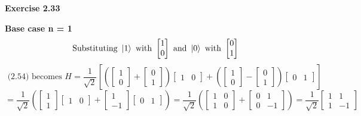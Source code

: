 \documentclass{article}
\begin{document}
\begin{framed}
    \noindent \textbf{Exercise 2.33}
    
    \medskip
    \textbf{Base case n = 1}
    $$
    \text{Substituting } \ket{1} \text{ with } \begin{bmatrix}1 \\ 0\end{bmatrix} \text{ and } \ket{0} \text{ with } \begin{bmatrix}0 \\ 1\end{bmatrix} $$
    $$\text{ (2.54) becomes } H = \frac{1}{\sqrt{2}}[(\begin{bmatrix}1 \\ 0\end{bmatrix} + \begin{bmatrix}0 \\ 1\end{bmatrix})\begin{bmatrix}1 & 0\end{bmatrix} + (\begin{bmatrix}1 \\ 0\end{bmatrix} - \begin{bmatrix}0 \\ 1\end{bmatrix})\begin{bmatrix}0 & 1\end{bmatrix}]
    $$
    $$
    = \frac{1}{\sqrt2}(\begin{bmatrix}1 \\ 1\end{bmatrix}\begin{bmatrix}1 & 0\end{bmatrix} + \begin{bmatrix}1 \\ -1\end{bmatrix}\begin{bmatrix}0 & 1\end{bmatrix}) = \frac{1}{\sqrt{2}}(\begin{bmatrix}1 & 0 \\ 1 & 0\end{bmatrix}+\begin{bmatrix} 0 & 1 \\ 0 & -1\end{bmatrix}) = \frac{1}{\sqrt{2}}\begin{bmatrix}1 & 1 \\ 1 & -1\end{bmatrix}
$$
\end{framed}
\end{document}
